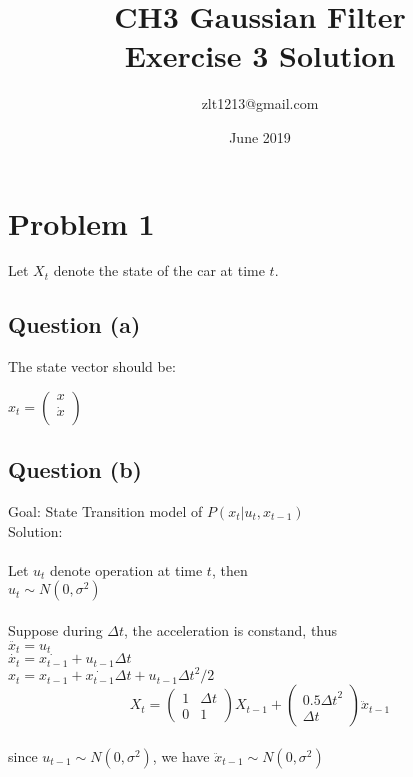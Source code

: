 \documentclass{article}
\title{ CH3 Gaussian Filter \\  Exercise 3 Solution}
\author{zlt1213@gmail.com}
\date{June 2019}
\begin{document}
\maketitle

\section{Problem 1}
Let $X_t$ denote the state of the car at time $t$. 
\subsection{Question (a)}
The state vector should be:

$
x_t = 
\begin{pmatrix}
x \\
\dot{x}\\
\end{pmatrix}
$



\subsection{Question (b)}
Goal: State Transition model of $P(x_t | u_t, x_{t-1})$ \\
Solution:\\ \\
Let $u_t$ denote operation at time $t$, then \\
$u_t\sim{N(0, \sigma^2)}$ \\ \\
Suppose during $\Delta t$, the acceleration is constand, thus\\
$\ddot{x_t}=u_t$\\
$\dot{x_t} = \dot{x_{t-1}}+u_{t-1} \Delta t$ \\
$x_t = x_{t-1}+ \dot{x_{t-1}}\Delta t + u_{t-1}{\Delta t}^2/2$\\

$$
X_t = 
\begin{pmatrix}
1 & \Delta t \\
0 & 1 
\end{pmatrix} X_{t-1} + 
\begin{pmatrix}
0.5{\Delta t}^2  \\
\Delta t
\end{pmatrix} \ddot{x}_{t-1}
$$\\
since $u_{t-1}\sim{N(0, \sigma^2)}$, we have $\ddot{x}_{t-1}\sim{N(0, \sigma^2)}$\\
\end{document}

